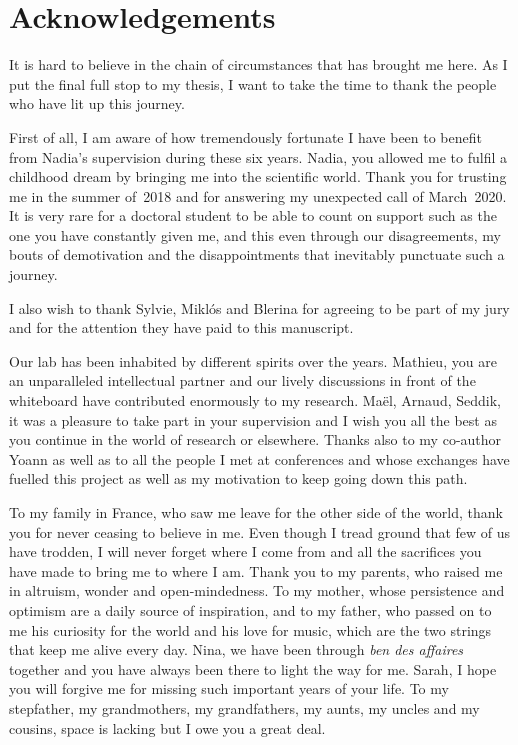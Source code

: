 \chapter*{Acknowledgements}

It is hard to believe in the chain of circumstances that has brought me here.
As I put the final full stop to my thesis, I want to take the time to thank the people who have lit up this journey.

First of all, I am aware of how tremendously fortunate I have been to benefit from Nadia’s supervision during these six years.
Nadia, you allowed me to fulfil a childhood dream by bringing me into the scientific world.
Thank you for trusting me in the summer of~2018 and for answering my unexpected call of March~2020.
It is very rare for a doctoral student to be able to count on support such as the one you have constantly given me, and this even through our disagreements, my bouts of demotivation and the disappointments that inevitably punctuate such a journey.

I also wish to thank Sylvie, Miklós and Blerina for agreeing to be part of my jury and for the attention they have paid to this manuscript.

Our lab has been inhabited by different spirits over the years.
Mathieu, you are an unparalleled intellectual partner and our lively discussions in front of the whiteboard have contributed enormously to my research.
Maël, Arnaud, Seddik, it was a pleasure to take part in your supervision and I wish you all the best as you continue in the world of research or elsewhere.
Thanks also to my co-author Yoann as well as to all the people I met at conferences and whose exchanges have fuelled this project as well as my motivation to keep going down this path.

To my family in France, who saw me leave for the other side of the world, thank you for never ceasing to believe in me.
Even though I tread ground that few of us have trodden, I will never forget where I come from and all the sacrifices you have made to bring me to where I am.
Thank you to my parents, who raised me in altruism, wonder and open-mindedness.
To my mother, whose persistence and optimism are a daily source of inspiration, and to my father, who passed on to me his curiosity for the world and his love for music, which are the two strings that keep me alive every day.
Nina, we have been through \emph{ben des affaires} together and you have always been there to light the way for me.
Sarah, I hope you will forgive me for missing such important years of your life.
To my stepfather, my grandmothers, my grandfathers, my aunts, my uncles and my cousins, space is lacking but I owe you a great deal.

